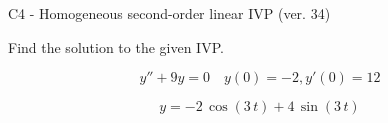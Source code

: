 \begin{exercise}
  \begin{exerciseTitle}C4 - Homogeneous second-order linear IVP (ver. 34)\end{exerciseTitle}
  \begin{exerciseStatement}
    
Find the solution to the given IVP.

    
\[y''+9y = 0 \hspace{1em} y(0) = -2 , y'(0) = 12\]

  \end{exerciseStatement}
  \begin{exerciseAnswer}
    
\[y= -2 \, \cos\left(3 \, t\right) + 4 \, \sin\left(3 \, t\right)\]

  \end{exerciseAnswer}
\end{exercise}